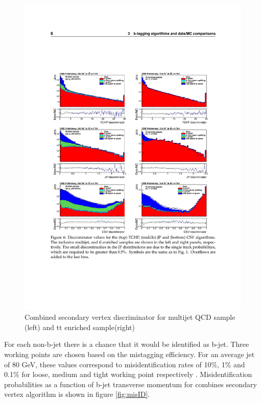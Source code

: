 \begin{figure}[ht]
	\includegraphics[width=\textwidth]{Figures/b-tag_csv.pdf}
	\caption{Combined secondary vertex discriminator for multijet QCD sample (left) and tt enriched sample(right)\cite{CMS:2013vea}}
	\label{fig:csv}
\end{figure}
For each non-b-jet there is a chance that it would be identified as b-jet. Three working points are chosen based on the mistagging efficiency. For an average jet of 80 GeV, these values correspond to misidentification rates of 10\%, 1\% and 0.1\%  for loose, medium and tight working point respectively \cite{1748-0221-8-04-P04013}. Misidentification probabilities as a function of b-jet transverse momentum for combines secondary vertex algorithm is shown in figure \ref{fig:misID}. 
